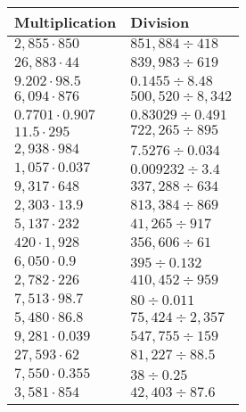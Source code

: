 \begin{longtable}[]{@{}ll@{}}
\toprule
Multiplication & Division\tabularnewline
\midrule
\endhead
\(2,855\cdot850\) & \(851,884÷418\)\tabularnewline
\(26,883\cdot44\) & \(839,983÷619\)\tabularnewline
\(9.202\cdot98.5\) & \(0.1455÷8.48\)\tabularnewline
\(6,094\cdot876\) & \(500,520÷8,342\)\tabularnewline
\(0.7701\cdot0.907\) & \(0.83029÷0.491\)\tabularnewline
\(11.5\cdot295\) & \(722,265÷895\)\tabularnewline
\(2,938\cdot984\) & \(7.5276÷0.034\)\tabularnewline
\(1,057\cdot0.037\) & \(0.009232÷3.4\)\tabularnewline
\(9,317\cdot648\) & \(337,288÷634\)\tabularnewline
\(2,303\cdot13.9\) & \(813,384÷869\)\tabularnewline
\(5,137\cdot232\) & \(41,265÷917\)\tabularnewline
\(420\cdot1,928\) & \(356,606÷61\)\tabularnewline
\(6,050\cdot0.9\) & \(395÷0.132\)\tabularnewline
\(2,782\cdot226\) & \(410,452÷959\)\tabularnewline
\(7,513\cdot98.7\) & \(80÷0.011\)\tabularnewline
\(5,480\cdot86.8\) & \(75,424÷2,357\)\tabularnewline
\(9,281\cdot0.039\) & \(547,755÷159\)\tabularnewline
\(27,593\cdot62\) & \(81,227÷88.5\)\tabularnewline
\(7,550\cdot0.355\) & \(38÷0.25\)\tabularnewline
\(3,581\cdot854\) & \(42,403÷87.6\)\tabularnewline
\bottomrule
\end{longtable}
